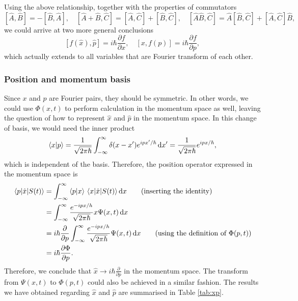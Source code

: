 \documentclass{article}
\theoremstyle{nonumberplain}
\begin{document}
Using the above relationship, together with the properties of commutators
\[
    \boxed{
        [\hat{A} , \hat{B} ] = - [\hat{B} , \hat{A} ], \quad
        [\hat{A} +\hat{B}, \hat{C} ] = [\hat{A} ,\hat{C} ] + [\hat{B} ,\hat{C} ], \quad
        [\hat{A} \hat{B} , \hat{C} ] = \hat{A}  [\hat{B} ,\hat{C} ] + [\hat{A} , \hat{C} ] \hat{B},
    }
\]
we could arrive at two more general conclusions 
\[
    [f(\hat{x} ), \hat{p} ] = i \hbar  \frac{\partial f}{\partial x},
    \quad 
    [x,f(p)] = i \hbar  \frac{\partial f}{\partial p},  
\]
which actually extends to all variables that are Fourier transform of each other.
\subsubsection{Position and momentum basis}
Since $x$ and $p$ are Fourier pairs, they should be symmetric. In other words, we could use $\Phi (x,t)$ to perform calculation in the momentum space as well, leaving the question of how to represent $\hat{x} $ and $\hat{p} $ in the momentum space. In this change of basis, we would need the inner product
\[
    \braket{x}{p} = \frac{1}{\sqrt{2 \pi \hbar}} \int_{-\infty}^{\infty} \delta (x-x^\prime ) e^{i p x^\prime /\hbar} \,\mathrm{d}x^\prime 
    =  \frac{1}{\sqrt{2 \pi \hbar}} e^{i p x /\hbar},
\]
which is independent of the basis. Therefore, the position operator expressed in the momentum space is 
\[
    \begin{aligned}
        \mel{p}{\hat{x} }{S(t)}
        &= \int_{-\infty }^{\infty } \braket{p}{x} \mel{x}{\hat{x} }{S(t)}\mathrm{d} x \qquad \text{(inserting the identity)} \\
        &= \int_{-\infty}^{\infty} \frac{e^{- i p x/h}}{\sqrt{2 \pi  \hbar } } x \Psi (x,t) \,\mathrm{d}x \\
        &= i \hbar \frac{\partial }{\partial p} \int_{-\infty}^{\infty} \frac{e^{- i p x/h}}{\sqrt{2 \pi  \hbar } } \Psi (x,t) \,\mathrm{d}x \qquad \text{(using the definition of $\Phi(p,t)$)}\\
        &= i \hbar \frac{\partial \Phi }{\partial p} .
    \end{aligned}
\]
Therefore, we conclude that $\hat{x} \to i \hbar  \frac{\partial }{\partial p} $ in the momentum space. The transform from $\Psi (x,t)$ to $\Phi (p,t)$ could also be achieved in a similar fashion. The results we have obtained regarding $\hat{x} $ and $\hat{p} $ are summarised in Table \ref{tab:xp}.
\end{document}
